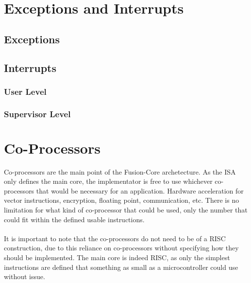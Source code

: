 \documentclass[letterpaper, 11pt]{article}
\begin{document}
\section{Exceptions and Interrupts}
\subsection{Exceptions}


\subsection{Interrupts}
\subsubsection{User Level}
\subsubsection{Supervisor Level}

\section{Co-Processors}
\paragraph{}Co-processors are the main point of the Fusion-Core archetecture. As the ISA only defines the main core, the implementator is free to use
whichever co-processors that would be necessary for an application. Hardware acceleration for vector instructions, encryption, floating point, communication,
etc. There is no limitation for what kind of co-processor that could be used, only the number that could fit within the defined usable instructions.
\paragraph{}It is important to note that the co-processors do not need to be of a RISC construction, due to this reliance on co-processors without
specifying how they should be implemented. The main core is indeed RISC, as only the simplest instructions are defined that something as small as a microcontroller
could use without issue.
\end{document}
